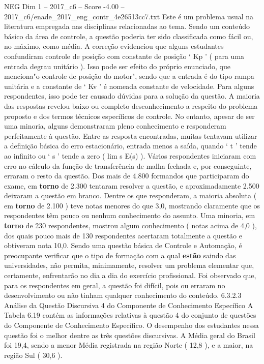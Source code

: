 \begin{textsample}{NEG Dim 1 – 2017\_c6 – Score -4.00 – 2017\_c6/enade\_2017\_eng\_contr\_4e26513cc7.txt}
Este é um problema usual na literatura empregada nas disciplinas relacionadas ao tema.
Sendo um conteúdo básico da área de controle, a questão poderia ter sido classificada como fácil ou, no máximo, como média.
A correção evidenciou que alguns estudantes confundiram controle de posição com constante de posição ‘ Kp ’ ( para uma entrada degrau unitário ).
Isso pode ser efeito do próprio enunciado, que menciona"o controle de posição do motor", sendo que a entrada é do tipo rampa unitária e a constante de ‘ Kv ’ é nomeada constante de velocidade.
Para alguns respondentes, isso pode ter causado dúvidas para a solução da questão.
A maioria das respostas revelou baixo ou completo desconhecimento a respeito do problema proposto e dos termos técnicos específicos de controle.
No entanto, apesar de ser uma minoria, alguns demonstraram pleno conhecimento e responderam perfeitamente à questão.
Entre as resposta encontradas, muitas tentavam utilizar a definição básica do erro estacionário, entrada menos a saída, quando ‘ t ’ tende ao infinito ou ‘ s ’ tende a zero ( lim s E(s) ).
Vários respondentes iniciaram com erro no cálculo da função de transferência de malha fechada e, por conseguinte, erraram o resto da questão.
Dos mais de 4.800 formandos que participaram do exame, em \textbf{torno} de 2.300 tentaram resolver a questão, e aproximadamente 2.500 deixaram a questão em branco.
Dentre os que responderam, a maioria absoluta ( em \textbf{torno} de 2.100 ) teve notas menores do que 3,0, mostrando claramente que os respondentes têm pouco ou nenhum conhecimento do assunto.
Uma minoria, em \textbf{torno} de 230 respondentes, mostrou algum conhecimento ( notas acima de 4,0 ), dos quais pouco mais de 130 respondentes acertaram totalmente a questão e obtiveram nota 10,0.
Sendo uma questão básica de Controle e Automação, é preocupante verificar que o tipo de formação com a qual \textbf{estão} saindo das universidades, não permita, minimamente, resolver um problema elementar que, certamente, enfrentarão no dia a dia do exercício profissional.
Foi observado que, para os respondentes em geral, a questão foi difícil, pois ou erraram no desenvolvimento ou não tinham qualquer conhecimento do conteúdo. 6.3.2.3 Análise da Questão Discursiva 4 do Componente de Conhecimento Específico A Tabela 6.19 contém as informações relativas à questão 4 do conjunto de questões do Componente de Conhecimento Específico.
O desempenho dos estudantes nessa questão foi o melhor dentre as três questões discursivas.
A Média geral do Brasil foi 19,4, sendo a menor Média registrada na região Norte ( 12,8 ), e a maior, na região Sul ( 30,6 ).

\end{textsample}
